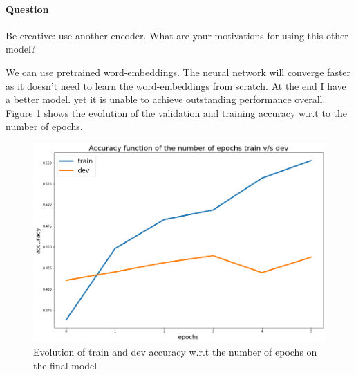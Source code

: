 \documentclass[11pt]{article}
\numberwithin{figure}{section} %
\begin{document}
\paragraph{Question} Be creative: use another encoder. What are your motivations for
using this other model?

We can use pretrained word-embeddings. The neural network will converge faster as it doesn't need to learn the word-embeddings from
scratch. At the end I have a better model. yet it is unable to achieve outstanding performance overall. Figure \ref{fig:graph_epoch2}
shows the evolution of the validation and training accuracy w.r.t to the number of epochs.

\begin{figure}[H]
		\centering
		\includegraphics[width=1\linewidth]{images/graph_acc2}
		\caption{Evolution of train and dev accuracy w.r.t the number of epochs on the final model}
		\label{fig:graph_epoch2}
\end{figure}
\end{document}
